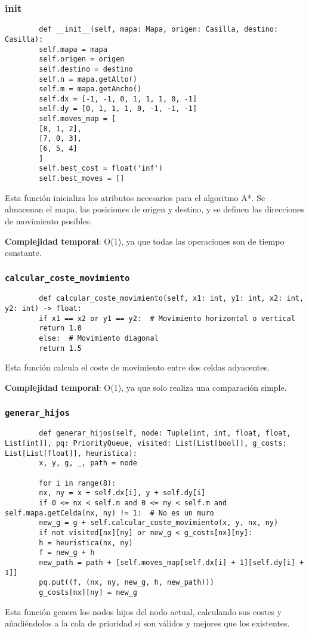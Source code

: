 \documentclass[a4paper,12pt]{article}
\begin{document}
	\subsubsection{init}
	\begin{verbatim}
		def __init__(self, mapa: Mapa, origen: Casilla, destino: Casilla):
		self.mapa = mapa
		self.origen = origen
		self.destino = destino
		self.n = mapa.getAlto()
		self.m = mapa.getAncho()
		self.dx = [-1, -1, 0, 1, 1, 1, 0, -1]
		self.dy = [0, 1, 1, 1, 0, -1, -1, -1]
		self.moves_map = [
		[8, 1, 2],
		[7, 0, 3],
		[6, 5, 4]
		]
		self.best_cost = float('inf')
		self.best_moves = []
	\end{verbatim}
	Esta función inicializa los atributos necesarios para el algoritmo A*. Se almacenan el mapa, las posiciones de origen y destino, y se definen las direcciones de movimiento posibles.
	
	\textbf{Complejidad temporal}: O(1), ya que todas las operaciones son de tiempo constante.
	
	\subsubsection{\texttt{calcular\_coste\_movimiento}}
	\begin{verbatim}
		def calcular_coste_movimiento(self, x1: int, y1: int, x2: int, y2: int) -> float:
		if x1 == x2 or y1 == y2:  # Movimiento horizontal o vertical
		return 1.0
		else:  # Movimiento diagonal
		return 1.5
	\end{verbatim}
	Esta función calcula el coste de movimiento entre dos celdas adyacentes. 
	
	\textbf{Complejidad temporal}: O(1), ya que solo realiza una comparación simple.
	
	\subsubsection{\texttt{generar\_hijos}}
	\begin{verbatim}
		def generar_hijos(self, node: Tuple[int, int, float, float, List[int]], pq: PriorityQueue, visited: List[List[bool]], g_costs: List[List[float]], heuristica):
		x, y, g, _, path = node
		
		for i in range(8):
		nx, ny = x + self.dx[i], y + self.dy[i]
		if 0 <= nx < self.n and 0 <= ny < self.m and self.mapa.getCelda(nx, ny) != 1:  # No es un muro
		new_g = g + self.calcular_coste_movimiento(x, y, nx, ny)
		if not visited[nx][ny] or new_g < g_costs[nx][ny]:
		h = heuristica(nx, ny)
		f = new_g + h
		new_path = path + [self.moves_map[self.dx[i] + 1][self.dy[i] + 1]]
		pq.put((f, (nx, ny, new_g, h, new_path)))
		g_costs[nx][ny] = new_g
	\end{verbatim}
	Esta función genera los nodos hijos del nodo actual, calculando sus costes y añadiéndolos a la cola de prioridad si son válidos y mejores que los existentes.
	
\end{document}
